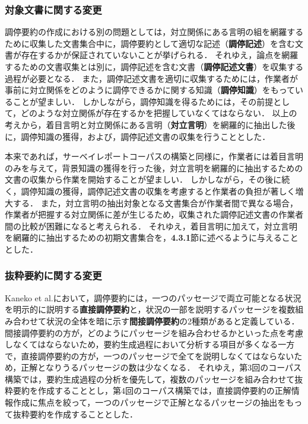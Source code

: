 \documentclass[japanese]{jnlp_1.4}
\begin{document}
\subsubsection{対象文書に関する変更}

{調停}要約の作成における別の問題としては，{対立}関係にある言明の組を網羅するために収集した文書集合中に，調停要約として適切な記述（{\bf 調停記述}）を含む文書が存在するかが保証されていないことが挙げられる．
それゆえ，論点を網羅するための文書収集とは別に，調停記述を含む文書（{\bf 調停記述文書}）を収集する過程が必要となる．
また，調停記述文書を適切に収集するためには，作業者が事前に対立関係をどのように調停できるかに関する知識（{\bf 調停知識}）をもっていることが望ましい．
しかしながら，調停知識を得るためには，その前提として，どのような対立関係が存在するかを把握していなくてはならない．
以上の考えから，着目言明と対立関係にある言明（{\bf 対立言明}）を網羅的に抽出した後に，調停知識の獲得，および，調停記述文書の収集を行うこととした．

本来であれば，サーベイレポートコーパスの構築と同様に，作業者には着目言明のみを与えて，背景知識の獲得を行った後，対立言明を網羅的に抽出するための文書の収集から作業を開始することが望ましい．
しかしながら，その後に続く，調停知識の獲得，調停記述文書の収集を考慮すると作業者の負担が著しく増大する．
また，対立言明の抽出対象となる文書集合が作業者間で異なる場合，作業者が把握する対立関係に差が生じるため，収集された調停記述文書の作業者間の比較が困難になると考えられる．
それゆえ，着目言明に加えて，対立言明を網羅的に抽出するための初期文書集合を，{\bf 4.3.1}節に述べるように与えることとした．


\subsubsection{抜粋要約に関する変更}

Kaneko et al.\citeyear{Kaneko2009}において，調停要約には，一つのパッセージで両立可能となる状況を明示的に説明する{\bf 直接調停要約}と，状況の一部を説明するパッセージを複数組み合わせて状況の全体を暗に示す{\bf 間接調停要約}の2種類があると定義している．
間接調停要約の方が，どのようにパッセージを組み合わせるかといった点を考慮しなくてはならないため，要約生成過程において分析する項目が多くなる一方で，直接調停要約の方が，一つのパッセージで全てを説明しなくてはならないため，正解となりうるパッセージの数は少なくなる．
それゆえ，第3回のコーパス構築では，要約生成過程の分析を優先して，複数のパッセージを組み合わせて抜粋要約を作成することとし，第4回のコーパス構築では，直接調停要約の正解情報作成に焦点を絞って，一つのパッセージで正解となるパッセージの抽出をもって抜粋要約を作成することとした．
\end{document}
